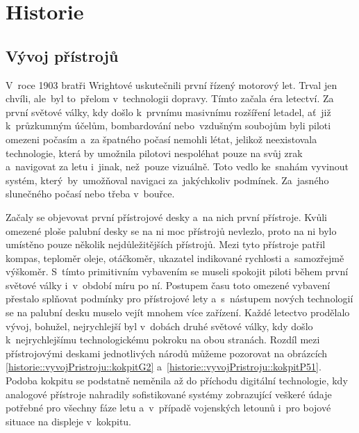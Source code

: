 \chapter{Historie}
	\section{Vývoj přístrojů}
	
		V~roce 1903 bratři Wrightové uskutečnili první řízený motorový let. Trval jen chvíli, ale~byl to~přelom v~technologii dopravy. Tímto začala éra letectví. Za první světové války, kdy došlo k~prvnímu masivnímu rozšíření letadel,  ať~již k~průzkumným účelům, bombardování nebo~vzdušným soubojům byli piloti omezeni počasím a~za špatného počasí nemohli létat, jelikož neexistovala technologie, která by umožnila pilotovi nespoléhat pouze na svůj zrak a~navigovat za letu i~jinak, než~pouze vizuálně. Toto vedlo ke~snahám vyvinout systém, který~by~umožňoval navigaci za~jakýchkoliv podmínek. Za~jasného slunečného počasí nebo třeba v~bouřce.\par
		
		Začaly se objevovat první přístrojové desky a~na nich první přístroje. Kvůli omezené ploše palubní desky se na ni moc přístrojů nevlezlo, proto na ni bylo umístěno pouze několik nejdůležitějších přístrojů. Mezi tyto přístroje patřil kompas, teploměr oleje, otáčkoměr, ukazatel indikované rychlosti a~samozřejmě výškoměr. S~tímto primitivním vybavením se museli spokojit piloti během první světové války i~v~období míru po ní. Postupem času toto omezené vybavení přestalo splňovat podmínky pro přístrojové lety a~s~nástupem nových technologií se na palubní desku muselo vejít mnohem více zařízení. Každé letectvo prodělalo vývoj, bohužel, nejrychlejší byl v~dobách druhé světové války, kdy došlo k~nejrychlejšímu technologickému pokroku na obou stranách. Rozdíl mezi přístrojovými deskami jednotlivých národů můžeme pozorovat na obrázcích \ref{historie::vyvojPristroju::kokpitG2} a~\ref{historie::vyvojPristroju::kokpitP51}.
		Podoba kokpitu se podstatně neměnila až do příchodu digitální technologie, kdy analogové přístroje nahradily sofistikované systémy zobrazující veškeré údaje potřebné pro všechny fáze letu a~v~případě vojenských letounů i~pro bojové situace na displeje v~kokpitu. 
		
